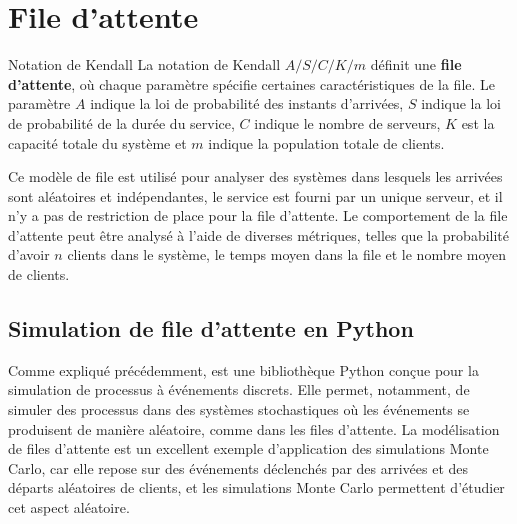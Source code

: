     \section{File d'attente}
        \begin{definition}{Notation de Kendall}
            La notation de Kendall $A/S/C/K/m$ définit une \textbf{file d'attente}, où chaque paramètre spécifie certaines caractéristiques de la file. Le paramètre $A$ indique la loi de probabilité des instants d'arrivées, $S$ indique la loi de probabilité de la durée du service, $C$ indique le nombre de serveurs, $K$ est la capacité totale du système et $m$ indique la population totale de clients.
        \end{definition}
        Ce modèle de file est utilisé pour analyser des systèmes dans lesquels les arrivées sont aléatoires et indépendantes, le service est fourni par un unique serveur, et il n'y a pas de restriction de place pour la file d'attente. Le comportement de la file d'attente peut être analysé à l'aide de diverses métriques, telles que la probabilité d'avoir $n$ clients dans le système, le temps moyen dans la file et le nombre moyen de clients.

        \subsection{Simulation de file d'attente en Python}
            Comme expliqué précédemment,  est une bibliothèque Python conçue pour la simulation de processus à événements discrets. Elle permet, notamment, de simuler des processus dans des systèmes stochastiques où les événements se produisent de manière aléatoire, comme dans les files d'attente. La modélisation de files d'attente est un excellent exemple d'application des simulations Monte Carlo, car elle repose sur des événements déclenchés par des arrivées et des départs aléatoires de clients, et les simulations Monte Carlo permettent d'étudier cet aspect aléatoire.

